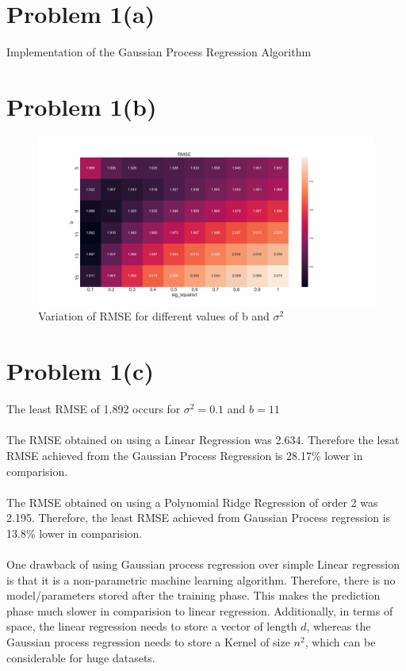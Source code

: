\documentclass[openany,11pt]{homework}
\begin{document}
\maketitle

\section*{Problem 1(a)}

Implementation of the Gaussian Process Regression Algorithm

\section*{Problem 1(b)}

\begin{figure}[h]
	\centering
	\includegraphics[width = \textwidth]{Homework_3_export/1b.png}
	\caption{Variation of RMSE for different values of b and $\sigma^2$}
\end{figure}

\section*{Problem 1(c)}

The least RMSE of 1.892 occurs for $\sigma^2 = 0.1$ and $b = 11$
\\
\\
The RMSE obtained on using a Linear Regression was 2.634. Therefore the lesat RMSE achieved from the Gaussian Process Regression is 28.17\% lower in comparision.
\\
\\
The RMSE obtained on using a Polynomial Ridge Regression of order 2 was 2.195. Therefore, the least RMSE achieved from Gaussian Process regression is 13.8\% lower in comparision.
\\
\\
One drawback of using Gaussian process regression over simple Linear regression is that it is a non-parametric machine learning algorithm. Therefore, there is no model/parameters stored after the training phase. This makes the prediction phase much slower in comparision to linear regression. Additionally, in terms of space, the linear regression needs to store a vector of length $d$, whereas the Gaussian process regression needs to store a Kernel of size $n^2$, which can be considerable for huge datasets.
\end{document}
